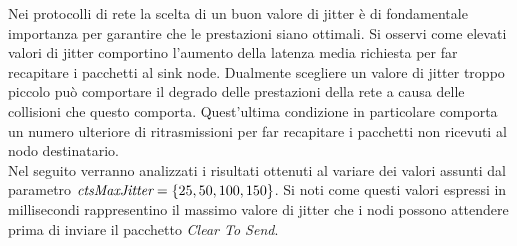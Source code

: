 \documentclass[binding=0.6cm,TFA]{sapthesis}
\begin{document}
Nei protocolli di rete la scelta di un buon valore di jitter è di fondamentale importanza per garantire che le prestazioni siano ottimali. Si osservi
come elevati valori di jitter comportino l'aumento della latenza media richiesta per far recapitare i pacchetti al sink node. Dualmente
scegliere un valore di jitter troppo piccolo può comportare il degrado delle prestazioni della rete a causa delle collisioni che questo comporta.
Quest'ultima condizione in particolare comporta un numero ulteriore di ritrasmissioni per far recapitare i pacchetti non ricevuti al nodo destinatario.\\

Nel seguito verranno analizzati i risultati ottenuti al variare dei valori assunti dal parametro $\emph{ctsMaxJitter}=\{25,50,100,150\}$. Si noti come
questi valori espressi in millisecondi rappresentino il massimo valore di jitter che i nodi possono attendere prima di inviare il pacchetto \emph{Clear To Send}.
\end{document}
